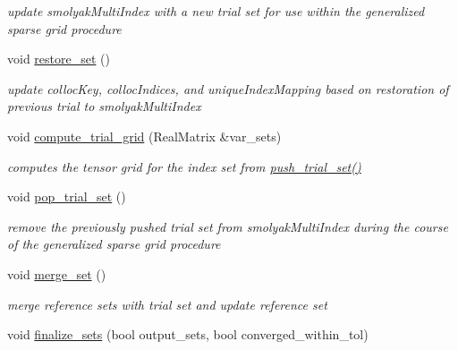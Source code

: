 \begin{DoxyCompactItemize}
\begin{DoxyCompactList}\small\item\em update smolyak\+Multi\+Index with a new trial set for use within the generalized sparse grid procedure \end{DoxyCompactList}\item 
void \hyperlink{classPecos_1_1CombinedSparseGridDriver_ad9648693eacbe856825d2c78b73a3301}{restore\+\_\+set} ()\label{classPecos_1_1CombinedSparseGridDriver_ad9648693eacbe856825d2c78b73a3301}

\begin{DoxyCompactList}\small\item\em update colloc\+Key, colloc\+Indices, and unique\+Index\+Mapping based on restoration of previous trial to smolyak\+Multi\+Index \end{DoxyCompactList}\item 
void \hyperlink{classPecos_1_1CombinedSparseGridDriver_a392163a55c3c5c2b4357b5490009df62}{compute\+\_\+trial\+\_\+grid} (Real\+Matrix \&var\+\_\+sets)\label{classPecos_1_1CombinedSparseGridDriver_a392163a55c3c5c2b4357b5490009df62}

\begin{DoxyCompactList}\small\item\em computes the tensor grid for the index set from \hyperlink{classPecos_1_1CombinedSparseGridDriver_a99c17efb3a8e873b7708652cc1787370}{push\+\_\+trial\+\_\+set()} \end{DoxyCompactList}\item 
void \hyperlink{classPecos_1_1CombinedSparseGridDriver_a92b2604a79028bec35c176aee27e56bb}{pop\+\_\+trial\+\_\+set} ()\label{classPecos_1_1CombinedSparseGridDriver_a92b2604a79028bec35c176aee27e56bb}

\begin{DoxyCompactList}\small\item\em remove the previously pushed trial set from smolyak\+Multi\+Index during the course of the generalized sparse grid procedure \end{DoxyCompactList}\item 
void \hyperlink{classPecos_1_1CombinedSparseGridDriver_a9719b2ab5ff3d7f099fe721a2d7fc6b0}{merge\+\_\+set} ()\label{classPecos_1_1CombinedSparseGridDriver_a9719b2ab5ff3d7f099fe721a2d7fc6b0}

\begin{DoxyCompactList}\small\item\em merge reference sets with trial set and update reference set \end{DoxyCompactList}\item 
void \hyperlink{classPecos_1_1CombinedSparseGridDriver_a07e01bf89eb07535ea78132b8d533088}{finalize\+\_\+sets} (bool output\+\_\+sets, bool converged\+\_\+within\+\_\+tol)\label{classPecos_1_1CombinedSparseGridDriver_a07e01bf89eb07535ea78132b8d533088}


\end{DoxyCompactItemize}
